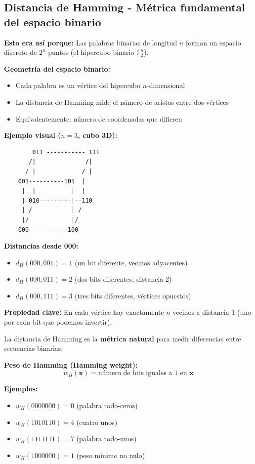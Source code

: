 \documentclass[10pt,a4paper]{article}
\begin{document}
\subsection{Distancia de Hamming - Métrica fundamental del espacio binario}

\begin{tcolorbox}[colback=rojoclaro!10,colframe=rojoclaro,title=🧠 FUNDAMENTO GEOMÉTRICO]
\textbf{Esto era así porque:} Las palabras binarias de longitud $n$ forman un espacio discreto de $2^n$ puntos (el hipercubo binario $\mathbb{F}_2^n$).

\textbf{Geometría del espacio binario:}
\begin{itemize}
\item Cada palabra es un vértice del hipercubo $n$-dimensional
\item La distancia de Hamming mide el número de aristas entre dos vértices
\item Equivalentemente: número de coordenadas que difieren
\end{itemize}

\textbf{Ejemplo visual ($n=3$, cubo 3D):}
\begin{verbatim}
        011 ----------- 111
       /|              /|
      / |             / |
    001----------101  |
     |  |          |  |
     | 010---------|--110
     | /           | /
     |/            |/
    000-----------100
\end{verbatim}

\textbf{Distancias desde 000:}
\begin{itemize}
\item $d_H(000, 001) = 1$ (un bit diferente, vecinos adyacentes)
\item $d_H(000, 011) = 2$ (dos bits diferentes, distancia 2)
\item $d_H(000, 111) = 3$ (tres bits diferentes, vértices opuestos)
\end{itemize}

\textbf{Propiedad clave:} En cada vértice hay exactamente $n$ vecinos a distancia 1 (uno por cada bit que podemos invertir).
\end{tcolorbox}

La distancia de Hamming es la \textbf{métrica natural} para medir diferencias entre secuencias binarias.

\textbf{Peso de Hamming (Hamming weight):}
$$w_H(\mathbf{x}) = \text{número de bits iguales a 1 en } \mathbf{x}$$

\textbf{Ejemplos:}
\begin{itemize}
\item $w_H(0000000) = 0$ (palabra todo-ceros)
\item $w_H(1010110) = 4$ (cuatro unos)
\item $w_H(1111111) = 7$ (palabra todo-unos)
\item $w_H(1000000) = 1$ (peso mínimo no nulo)
\end{itemize}
\end{document}
